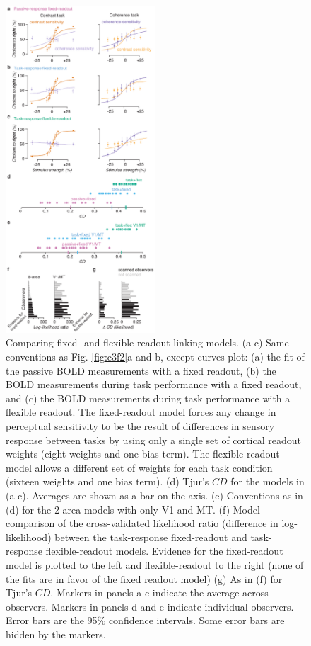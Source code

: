 \begin{figure}
\centering
\includegraphics[keepaspectratio,width=0.5\textwidth]{figs_c3/Fig7_readout.pdf}
\caption[Comparing fixed- and flexible-readout linking models]{Comparing fixed- and flexible-readout linking models. (a-c) Same conventions as Fig. \ref{fig:c3f2}a and b, except curves plot: (a) the fit of the passive BOLD measurements with a fixed readout, (b) the BOLD measurements during task performance with a fixed readout, and (c) the BOLD measurements during task performance with a flexible readout. The fixed-readout model forces any change in perceptual sensitivity to be the result of differences in sensory response between tasks by using only a single set of cortical readout weights (eight weights and one bias term). The flexible-readout model allows a different set of weights for each task condition (sixteen weights and one bias term). (d) Tjur’s $CD$ for the models in (a-c). Averages are shown as a bar on the axis. (e) Conventions as in (d) for the 2-area models with only V1 and MT. (f) Model comparison of the cross-validated likelihood ratio (difference in log-likelihood) between the task-response fixed-readout and task-response flexible-readout models. Evidence for the fixed-readout model is plotted to the left and flexible-readout to the right (none of the fits are in favor of the fixed readout model) (g) As in (f) for Tjur’s $CD$. Markers in panels a-c indicate the average across observers. Markers in panels d and e indicate individual observers. Error bars are the 95\% confidence intervals. Some error bars are hidden by the markers.}
\label{fig:c3f7}
\end{figure}


